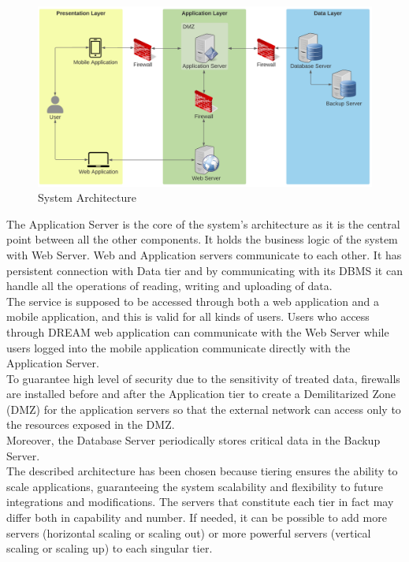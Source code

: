 \begin{center}
    \begin{figure}[h!]
  \includegraphics[width=\textwidth,height=\textheight,keepaspectratio]{./Images/System Architecture.png}
  \caption{System Architecture}
\end{figure}
\end{center}

The Application Server is the core of the system’s architecture as it is the central point between all the other components. It holds the business logic of the system with Web Server. Web and Application servers communicate to each other. It has persistent connection with Data tier and by communicating with its DBMS it can handle all the operations of reading, writing and uploading of data.\\

The service is supposed to be accessed through both a web application and a mobile application, and this is valid for all kinds of users. Users who access through DREAM web application can communicate with the Web Server while users logged into the mobile application communicate directly with the Application Server.\\

To guarantee high level of security due to the sensitivity of treated data, firewalls are installed before and after the Application tier to create a Demilitarized Zone (DMZ) for the application servers so that the external network can access only to the resources exposed in the DMZ. \\
Moreover, the Database Server periodically stores critical data in the Backup Server. \\

The described architecture has been chosen because tiering ensures the ability to scale applications, guaranteeing the system scalability and flexibility to future integrations and modifications.
The servers that constitute each tier in fact may differ both in capability and number. If needed, it can be possible to add more servers (horizontal scaling or scaling out) or more powerful servers (vertical scaling or scaling up) to each singular tier.  

\newpage